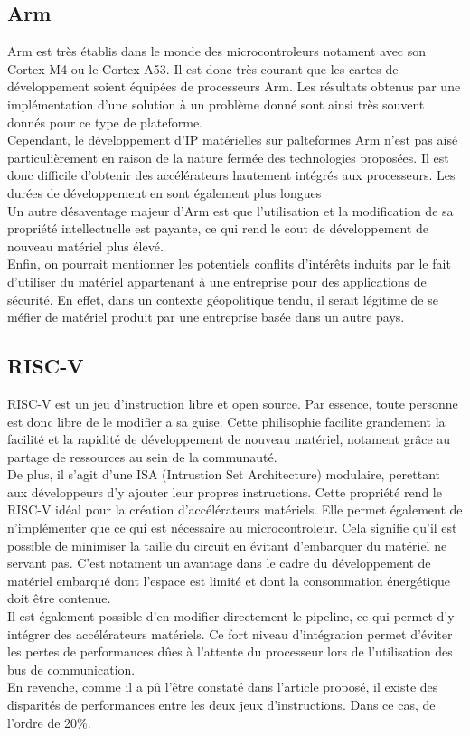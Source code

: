 \documentclass[10pt,a4paper]{article}
\begin{document}
\subsection{Arm}
Arm est très établis dans le monde des microcontroleurs notament avec son Cortex M4 ou le Cortex A53. Il est donc très courant que les cartes de développement soient équipées 
de processeurs Arm. Les résultats obtenus par une implémentation d'une solution à un problème donné sont ainsi très souvent donnés pour ce type de plateforme.\\
Cependant, le développement d'IP matérielles sur palteformes Arm n'est pas aisé particulièrement en raison de la nature fermée des technologies proposées. Il est donc difficile d'obtenir 
des accélérateurs hautement intégrés aux processeurs. Les durées de développement en sont également plus longues\\
Un autre désaventage majeur d'Arm est que l'utilisation et la modification de sa propriété intellectuelle est payante, ce qui rend le cout de développement de nouveau matériel plus élevé.\\
Enfin, on pourrait mentionner les potentiels conflits d'intérêts induits par le fait d'utiliser du matériel appartenant à une entreprise pour des applications de sécurité. En effet, dans 
un contexte géopolitique tendu, il serait légitime de se méfier de matériel produit par une entreprise basée dans un autre pays. 

\subsection{RISC-V}
RISC-V est un jeu d'instruction libre et open source. Par essence, toute personne est donc libre de le modifier a sa guise. Cette philisophie facilite grandement la facilité et la rapidité
de développement de nouveau matériel, notament grâce au partage de ressources au sein de la communauté.\\
De plus, il s'agit d'une ISA (Intrustion Set Architecture) modulaire, perettant aux développeurs d'y ajouter leur propres instructions. Cette propriété rend le RISC-V idéal pour la création 
d'accélérateurs matériels. Elle permet également de n'implémenter que ce qui est nécessaire au microcontroleur. Cela signifie qu'il est possible de minimiser la taille du circuit en évitant 
d'embarquer du matériel ne servant pas. C'est notament un avantage dans le cadre du développement de matériel embarqué dont l'espace est limité et dont la consommation énergétique doit être contenue. \\
Il est également possible d'en modifier directement le pipeline, ce qui permet d'y intégrer des accélérateurs matériels. Ce fort niveau d'intégration permet d'éviter les pertes de performances 
dûes à l'attente du processeur lors de l'utilisation des bus de communication.\\ 
En revenche, comme il a pû l'être constaté dans l'article proposé, il existe des disparités de performances entre les deux jeux d'instructions. Dans ce cas, de l'ordre de 20\%.
\end{document}
